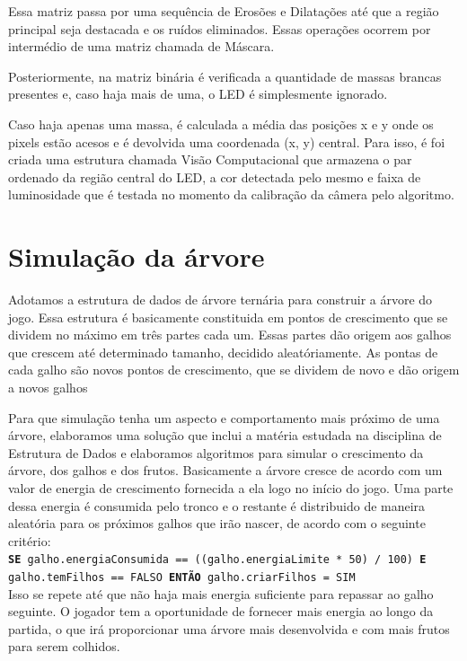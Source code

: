 \documentclass[12pt]{article}
\begin{document}
Essa matriz passa por uma sequ\^encia de Eros\~oes e Dilata\c c\~oes at\'e que a regi\~ao principal seja destacada
e os ru\'idos eliminados. Essas opera\c c\~oes ocorrem por interm\'edio de uma matriz chamada de M\'ascara.

Posteriormente, na matriz bin\'aria \'e verificada a quantidade de massas brancas presentes e, caso haja mais de uma,
o LED \'e simplesmente ignorado.

Caso haja apenas uma massa, \'e calculada a m\'edia das posi\c c\~oes x e y onde os pixels est\~ao acesos e \'e devolvida
uma coordenada (x, y) central. Para isso, \'e foi criada uma estrutura chamada Vis\~ao Computacional que armazena
o par ordenado da regi\~ao central do LED, a cor detectada pelo mesmo e faixa de luminosidade que \'e testada no momento
da calibra\c c\~ao da c\^amera pelo algoritmo.

\section{Simula\c c\~ao da \'arvore}

Adotamos a estrutura de dados de \'arvore tern\'aria para construir a \'arvore do jogo. Essa estrutura \'e basicamente constituida
em pontos de crescimento que se dividem no m\'aximo em tr\^es partes cada um. Essas partes d\~ao origem aos galhos que crescem at\'e
determinado tamanho, decidido aleat\'oriamente. As pontas de cada galho s\~ao novos pontos de crescimento,
que se dividem de novo e d\~ao origem a novos galhos

Para que simula\c c\~ao tenha um aspecto e comportamento mais pr\'oximo de uma \'arvore, elaboramos uma solu\c c\~ao que inclui
a mat\'eria estudada na disciplina de Estrutura de Dados e elaboramos algoritmos para simular o crescimento da \'arvore,
dos galhos e dos frutos. Basicamente a \'arvore cresce de acordo com um valor de energia de crescimento fornecida
a ela logo no in\'icio do jogo. Uma parte dessa energia \'e consumida pelo tronco e o restante \'e distribuido
de maneira aleat\'oria para os pr\'oximos galhos que ir\~ao nascer, de acordo com o seguinte crit\'erio: \\

 \texttt{\footnotesize{\textbf{SE} galho.energiaConsumida == ((galho.energiaLimite * 50) / 100) \textbf{E} galho.temFilhos == FALSO 
        \textbf{ENT\~AO} galho.criarFilhos = SIM}} \\


Isso se repete at\'e que n\~ao haja mais energia suficiente
para repassar ao galho seguinte. O jogador tem a oportunidade de fornecer mais energia ao longo da partida, o que
ir\'a proporcionar uma \'arvore mais desenvolvida e com mais frutos para serem colhidos.
\end{document}
